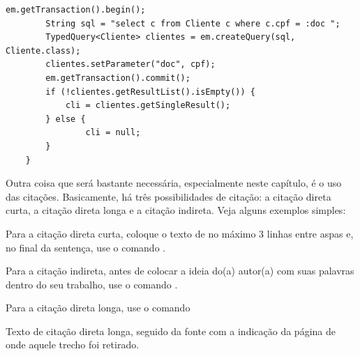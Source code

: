 \begin{quadro}[!htb]
\end{quadro}

\newpage
\begin{scriptsize}
\estiloCodigo
\begin{lstlisting}[caption={Um exemplo de inserção de códigos.}, label=excodigo, captionpos=t]
    em.getTransaction().begin();
        String sql = "select c from Cliente c where c.cpf = :doc ";
        TypedQuery<Cliente> clientes = em.createQuery(sql, Cliente.class);
        clientes.setParameter("doc", cpf);
        em.getTransaction().commit();
        if (!clientes.getResultList().isEmpty()) {
            cli = clientes.getSingleResult();
        } else {
                cli = null;
        }  
    }
\end{lstlisting}
\end{scriptsize}

Outra coisa que será bastante necessária, especialmente neste capítulo, é o uso das citações. Basicamente, há três possibilidades de citação: a citação direta curta, a citação direta longa e a citação indireta. Veja alguns exemplos simples:

Para a citação direta curta, coloque o texto de no máximo 3 linhas entre aspas e, no final da sentença, use o comando \cite[s.n]{abntex2-wiki-como-customizar}.

Para a citação indireta, antes de colocar a ideia do(a) autor(a) com suas palavras dentro do seu trabalho, use o comando .

Para a citação direta longa, use o comando
\begin{citacao}
Texto de citação direta longa, seguido da fonte com a indicação da página de onde aquele trecho foi retirado. \cite[p. 2]{abntex2-wiki-como-customizar}
\end{citacao}



